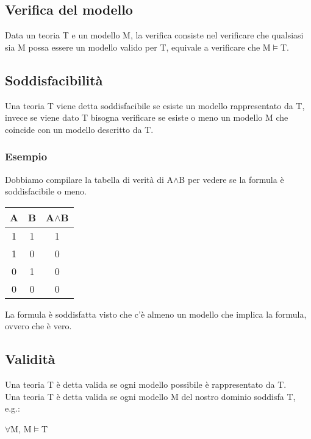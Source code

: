 \documentclass[../main.tex]{subfiles}
\begin{document}
    \subsection{Verifica del modello}
    Data un teoria T e un modello M, la verifica consiste nel verificare che qualsiasi sia M possa essere un modello valido per T, equivale a verificare che M$\models$T.

    \subsection{Soddisfacibilità}
    Una teoria T viene detta soddisfacibile se esiste un modello rappresentato da T, invece se viene dato T bisogna verificare se esiste o meno un modello M che coincide con un modello descritto da T.

    \subsubsection{Esempio}
    Dobbiamo compilare la tabella di verità di A$\land$B per vedere se la formula è soddisfacibile o meno.
    \begin{center}
        \begin{tabular}{|c|c|c|}
            \hline
            A & B & A$\land$B\\
            \hline
            1 & 1 & 1\\
            \hline
            1 & 0 & 0\\
            \hline
            0 & 1 & 0\\
            \hline
            0 & 0 & 0\\
            \hline
        \end{tabular}
    \end{center}
    La formula è soddisfatta visto che c'è almeno un modello che implica la formula, ovvero che è vero.

    \subsection{Validità}
    Una teoria T è detta valida se ogni modello possibile è rappresentato da T.\\
    Una teoria T è detta valida se ogni modello M del nostro dominio soddisfa T, e.g.:
    \begin{center}
        $\forall$M, M$\models$T
    \end{center}
\end{document}
